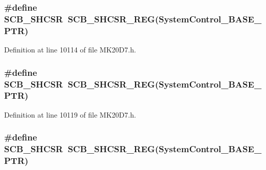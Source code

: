 \subsubsection[{\texorpdfstring{S\+C\+B\+\_\+\+S\+H\+C\+SR}{SCB_SHCSR}}]{\setlength{\rightskip}{0pt plus 5cm}\#define S\+C\+B\+\_\+\+S\+H\+C\+SR~{\bf S\+C\+B\+\_\+\+S\+H\+C\+S\+R\+\_\+\+R\+EG}({\bf System\+Control\+\_\+\+B\+A\+S\+E\+\_\+\+P\+TR})}\hypertarget{group___s_c_b___register___accessor___macros_ga00f70fc0cb709999835d54fb1a8d4112}{}\label{group___s_c_b___register___accessor___macros_ga00f70fc0cb709999835d54fb1a8d4112}


Definition at line 10114 of file M\+K20\+D7.\+h.

\subsubsection[{\texorpdfstring{S\+C\+B\+\_\+\+S\+H\+C\+SR}{SCB_SHCSR}}]{\setlength{\rightskip}{0pt plus 5cm}\#define S\+C\+B\+\_\+\+S\+H\+C\+SR~{\bf S\+C\+B\+\_\+\+S\+H\+C\+S\+R\+\_\+\+R\+EG}({\bf System\+Control\+\_\+\+B\+A\+S\+E\+\_\+\+P\+TR})}\hypertarget{group___s_c_b___register___accessor___macros_ga00f70fc0cb709999835d54fb1a8d4112}{}\label{group___s_c_b___register___accessor___macros_ga00f70fc0cb709999835d54fb1a8d4112}


Definition at line 10119 of file M\+K20\+D7.\+h.

\subsubsection[{\texorpdfstring{S\+C\+B\+\_\+\+S\+H\+C\+SR}{SCB_SHCSR}}]{\setlength{\rightskip}{0pt plus 5cm}\#define S\+C\+B\+\_\+\+S\+H\+C\+SR~{\bf S\+C\+B\+\_\+\+S\+H\+C\+S\+R\+\_\+\+R\+EG}({\bf System\+Control\+\_\+\+B\+A\+S\+E\+\_\+\+P\+TR})}\hypertarget{group___s_c_b___register___accessor___macros_ga00f70fc0cb709999835d54fb1a8d4112}{}\label{group___s_c_b___register___accessor___macros_ga00f70fc0cb709999835d54fb1a8d4112}


